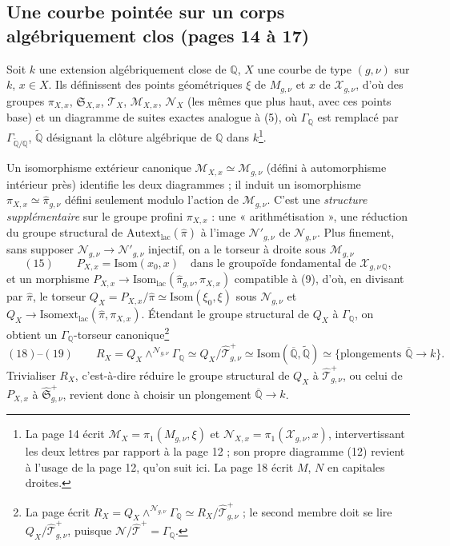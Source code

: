 \documentclass[11pt,a4paper]{article}
\begin{document}
\subsection*{Une courbe pointée sur un corps algébriquement clos (pages 14 à 17)}

Soit $k$ une extension algébriquement close de $\mathbb{Q}$, $X$ une courbe de
type $(g, \nu)$ sur $k$, $x \in X$. Ils définissent des points géométriques
$\xi$ de $M_{g,\nu}$ et $x$ de $\mathcal{X}_{g,\nu}$, d'où des groupes
$\pi_{X,x}$, $\mathfrak{S}_{X,x}$, $\mathcal{T}_X$, $\mathcal{M}_{X,x}$,
$\mathcal{N}_X$ (les mêmes que plus haut, avec ces points base) et un
diagramme de suites exactes analogue à (5), où $\Gamma_{\mathbb{Q}}$ est
remplacé par $\Gamma_{\widetilde{\mathbb{Q}}/\mathbb{Q}}$, $\widetilde{\mathbb{Q}}$
désignant la clôture algébrique de $\mathbb{Q}$ dans $k$\footnote{La page 14
écrit $\mathcal{M}_X = \pi_1(M_{g,\nu}, \xi)$ et
$\mathcal{N}_{X,x} = \pi_1(\mathcal{X}_{g,\nu}, x)$, intervertissant les deux
lettres par rapport à la page 12 ; son propre diagramme (12) revient à l'usage
de la page 12, qu'on suit ici. La page 18 écrit $M$, $N$ en capitales
droites.}.

Un isomorphisme extérieur canonique $\mathcal{M}_{X,x} \simeq \mathcal{M}_{g,\nu}$
(défini à automorphisme intérieur près) identifie les deux diagrammes ; il
induit un isomorphisme $\pi_{X,x} \simeq \hat\pi_{g,\nu}$ défini seulement
modulo l'action de $\mathcal{M}_{g,\nu}$. C'est une \emph{structure
supplémentaire} sur le groupe profini $\pi_{X,x}$ : une « arithmétisation »,
une réduction du groupe structural de $\mathrm{Autext}_{\mathrm{lac}}(\hat\pi)$
à l'image $\mathcal{N}'_{g,\nu}$ de $\mathcal{N}_{g,\nu}$. Plus finement, sans
supposer $\mathcal{N}_{g,\nu} \to \mathcal{N}'_{g,\nu}$ injectif, on a le
torseur à droite sous $\mathcal{M}_{g,\nu}$
\[
(15)\qquad P_{X,x} = \mathrm{Isom}(x_0, x) \quad \text{dans le groupoïde fondamental de } \mathcal{X}_{g,\nu\,\mathbb{Q}},
\]
et un morphisme $P_{X,x} \to \mathrm{Isom}_{\mathrm{lac}}(\hat\pi_{g,\nu}, \pi_{X,x})$
compatible à (9), d'où, en divisant par $\hat\pi$, le torseur
$Q_X = P_{X,x}/\hat\pi \simeq \mathrm{Isom}(\xi_0, \xi)$ sous
$\mathcal{N}_{g,\nu}$ et $Q_X \to \mathrm{Isomext}_{\mathrm{lac}}(\hat\pi, \pi_{X,x})$.
Étendant le groupe structural de $Q_X$ à $\Gamma_{\mathbb{Q}}$, on obtient un
$\Gamma_{\mathbb{Q}}$-torseur canonique\footnote{La page écrit
$R_X = Q_X \wedge^{\mathcal{N}_{g,\nu}} \Gamma_{\mathbb{Q}} \simeq R_X/\hat{\mathcal{T}}^{+}_{g,\nu}$ ;
le second membre doit se lire $Q_X/\hat{\mathcal{T}}^{+}_{g,\nu}$, puisque
$\mathcal{N}/\hat{\mathcal{T}}^{+} = \Gamma_{\mathbb{Q}}$.}
\[
(18)\text{--}(19)\qquad R_X = Q_X \wedge^{\mathcal{N}_{g,\nu}} \Gamma_{\mathbb{Q}} \simeq Q_X/\hat{\mathcal{T}}^{+}_{g,\nu}
\simeq \mathrm{Isom}(\overline{\mathbb{Q}}, \widetilde{\mathbb{Q}}) \simeq \{\text{plongements } \overline{\mathbb{Q}} \to k\}.
\]
Trivialiser $R_X$, c'est-à-dire réduire le groupe structural de $Q_X$ à
$\hat{\mathcal{T}}^{+}_{g,\nu}$, ou celui de $P_{X,x}$ à
$\hat{\mathfrak{S}}^{+}_{g,\nu}$, revient donc à choisir un plongement
$\overline{\mathbb{Q}} \to k$.
\end{document}
